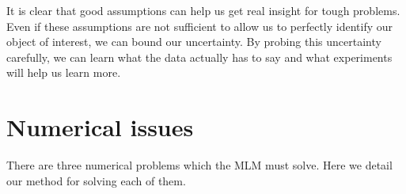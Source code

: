 It is clear that good assumptions can help us get real insight for tough problems. Even if these assumptions are not sufficient to allow us to perfectly identify our object of interest, we can bound our uncertainty.  By probing this uncertainty carefully, we can learn what the data actually has to say and what experiments will help us learn more.




\appendix


%
 

\section{Numerical issues}

\label{sec:optproblems}

There are three numerical problems which the MLM must solve.  Here we detail our method for solving each of them.

